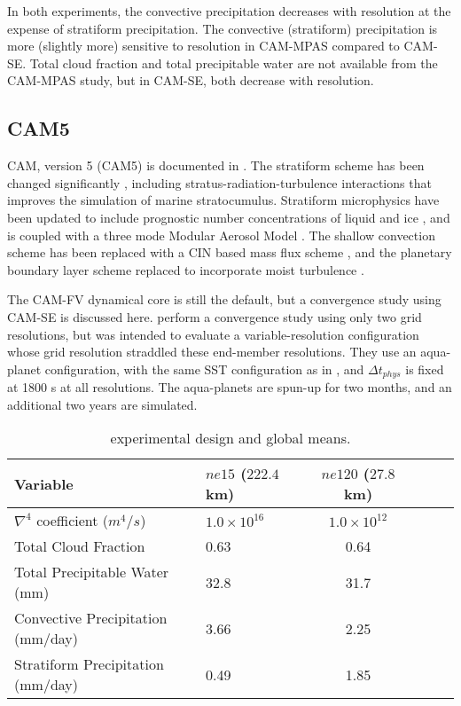 In both experiments, the convective precipitation decreases with resolution at the expense of stratiform precipitation. The convective (stratiform) precipitation is more (slightly more) sensitive to resolution in CAM-MPAS compared to CAM-SE. Total cloud fraction and total precipitable water are not available from the CAM-MPAS study, but in CAM-SE, both decrease with resolution.

\subsection{CAM5}

CAM, version 5 (CAM5) is documented in \citep{CAM5}. The stratiform scheme has been changed significantly \citep{PETAL2014JCLIM}, including stratus-radiation-turbulence interactions that improves the simulation of marine stratocumulus. Stratiform microphysics have been updated to include prognostic number concentrations of liquid and ice \citep{MG2008JC}, and is coupled with a three mode Modular Aerosol Model \citep{MAM}. The shallow convection scheme has been replaced with a CIN based mass flux scheme \citep{PB2009JC}, and the planetary boundary layer scheme replaced to incorporate moist turbulence \citep{BC2009JCLIM}.

The CAM-FV dynamical core is still the default, but a convergence study using CAM-SE is discussed here. \cite{ZetAl2014JCb} perform a convergence study using only two grid resolutions, but was intended to evaluate a variable-resolution configuration whose grid resolution straddled these end-member resolutions. They use an aqua-planet configuration, with the same SST configuration as in \cite{W2008TELLUS} \citep[`CONTROL' in][]{NH2000ASL}, and $\Delta t_{phys}$ is fixed at 1800 s at all resolutions. The aqua-planets are spun-up for two months, and an additional two years are simulated.

 \begin{table}
 \caption{\cite{ZetAl2014JCb} experimental design and global means.}
 \centering
 \scriptsize
 \begin{tabular}{llcccc}
 \hline
Variable & $ne15$ ($222.4$ km) & $ne120$ ($27.8$ km)\\
 \hline
   $\nabla^{4}$ coefficient ($m^4/s$) & $1.0 \times 10^{16}$ & $1.0 \times 10^{12}$ \\
   Total Cloud Fraction & 0.63 & 0.64 \\
   Total Precipitable Water (mm) & 32.8 & 31.7 \\
   Convective Precipitation (mm/day) & 3.66 & 2.25 \\
   Stratiform Precipitation (mm/day) & 0.49 & 1.85 \\
 \hline
 \end{tabular}
 \label{tbl:table1-5}
 \end{table}

